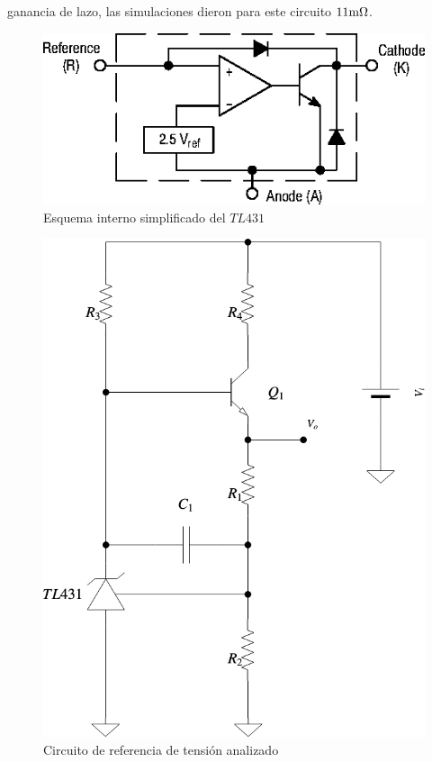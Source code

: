 ganancia de lazo, las simulaciones dieron para este circuito $11 \si[per-mode=symbol]{\milli\ohm}$.




\begin{figure}[H] %
\begin{center}
\includegraphics[width=0.50 \textwidth, angle=0]{./img/voltage_reference/reference2.png}
\end{center}
\caption{\label{fig:fig_vref_cir_2}\footnotesize{Esquema interno simplificado del $TL431$}}
\end{figure}




\vfill


\clearpage

\begin{figure}[H] %
\begin{center}
\includegraphics[width=0.5 \textwidth, angle=0]{./img/voltage_reference/reference1.png}
\caption{\label{fig:fig_vref_cir_1}\footnotesize{Circuito de referencia de tensión analizado}}
\end{center}
\end{figure}



\clearpage